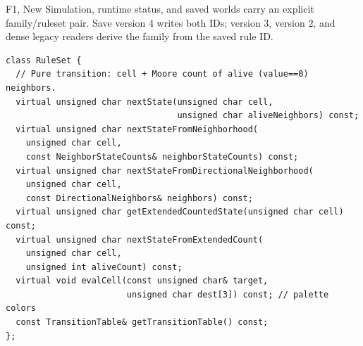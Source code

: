 F1, New Simulation, runtime status, and saved worlds carry an
explicit family/ruleset pair. Save version 4 writes both IDs; version 3,
version 2, and dense legacy readers derive the family from the saved rule ID.

\begin{lstlisting}
class RuleSet {
  // Pure transition: cell + Moore count of alive (value==0) neighbors.
  virtual unsigned char nextState(unsigned char cell,
                                  unsigned char aliveNeighbors) const;
  virtual unsigned char nextStateFromNeighborhood(
    unsigned char cell,
    const NeighborStateCounts& neighborStateCounts) const;
  virtual unsigned char nextStateFromDirectionalNeighborhood(
    unsigned char cell,
    const DirectionalNeighbors& neighbors) const;
  virtual unsigned char getExtendedCountedState(unsigned char cell) const;
  virtual unsigned char nextStateFromExtendedCount(
    unsigned char cell,
    unsigned int aliveCount) const;
  virtual void evalCell(const unsigned char& target,
                        unsigned char dest[3]) const; // palette colors
  const TransitionTable& getTransitionTable() const;
};
\end{lstlisting}

